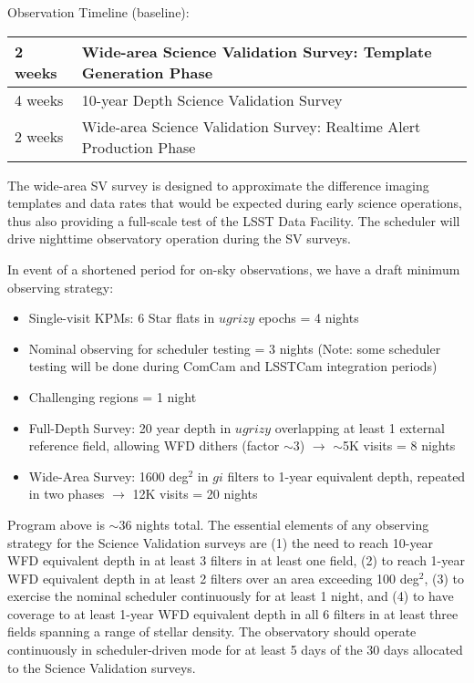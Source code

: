 Observation Timeline (baseline):

\begin{tabular}{| l | l |}
\hline
2 weeks &	Wide-area Science Validation Survey: Template Generation Phase \\
\hline
4 weeks &	10-year Depth Science Validation Survey \\
\hline
2 weeks &	Wide-area Science Validation Survey: Realtime Alert Production Phase \\
\hline
\end{tabular}

The wide-area SV survey is designed to approximate the difference imaging templates and data rates that would be expected during early science operations, thus also providing a full-scale test of the LSST Data Facility. The scheduler will drive nighttime observatory operation during the SV surveys.

In event of a shortened period for on-sky observations, we have a draft minimum observing strategy:

\begin{itemize}
\item Single-visit KPMs:
        6 Star flats in $ugrizy$  epochs = 4 nights
\item Nominal observing for scheduler testing = 3 nights (Note: some scheduler testing will be done during ComCam and LSSTCam integration periods)
\item Challenging regions = 1 night
\item Full-Depth Survey: 
        20 year depth in $ugrizy$ overlapping at least 1 external reference field, allowing WFD dithers (factor $\sim3$) $\rightarrow$ $\sim$5K visits = 8 nights
\item Wide-Area Survey:
        1600 deg$^2$ in $gi$ filters to 1-year equivalent depth, repeated in two phases $\rightarrow$ 12K visits = 20 nights
\end{itemize}

Program above is $\sim36$ nights total. The essential elements of any observing strategy for the Science Validation surveys are (1) the need to reach 10-year WFD equivalent depth in at least 3 filters in at least one field, (2) to reach 1-year WFD equivalent depth in at least 2 filters over an area exceeding 100 deg$^2$, (3) to exercise the nominal scheduler continuously for at least 1 night, and (4) to have coverage to at least 1-year WFD equivalent depth in all 6 filters in at least three fields spanning a range of stellar density. The observatory should operate continuously in scheduler-driven mode for at least 5 days of the 30 days allocated to the Science Validation surveys.

